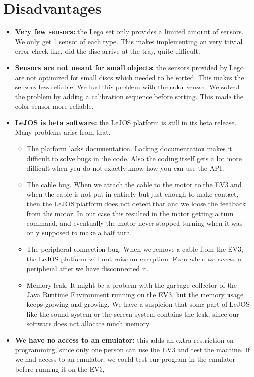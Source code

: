 \documentclass[a4paper,oneside,11pt]{article}
\begin{document}
\section{Disadvantages}
\begin{itemize}
    \item \textbf{Very few sensors:} the Lego set only provides a limited amount of sensors. We only get 1 sensor of each type. This makes implementing an very trivial error check like, did the disc arrive at the tray, quite difficult.
    \item \textbf{Sensors are not meant for small objects:} the sensors provided by Lego are not optimized for small discs which needed to be sorted. This makes the sensors less reliable. We had this problem with the color sensor. We solved the problem by adding a calibration sequence before sorting. This made the color sensor more reliable.
    \item \textbf{LeJOS is beta software: } the LeJOS platform is still in its beta release. Many problems arise from that.
        \begin{itemize}
            \item The platform lacks documentation. Lacking documentation makes it difficult to solve bugs in the code. Also the coding itself gets a lot more difficult when you do not exactly know how you can use the API.
            \item The cable bug. When we attach the cable to the motor to the EV3 and when the cable is not put in entirely but just enough to make contact, then the LeJOS platform does not detect that and we loose the feedback from the motor. In our case this resulted in the motor getting a turn command, and eventually the motor never stopped turning when it was only supposed to make a half turn.
            \item The peripheral connection bug. When we remove a cable from the EV3, the LeJOS platform will not raise an exception. Even when we access a peripheral after we have disconnected it.
            \item Memory leak. It might be a problem with the garbage collector of the Java Runtime Environment running on the EV3, but the memory usage keeps growing and growing. We have a suspicion that some part of LeJOS like the sound system or the screen system contains the leak, since our software does not allocate much memory.
        \end{itemize}
    \item \textbf{We have no access to an emulator: } this adds an extra restriction on programming, since only one person can use the EV3 and test the machine. If we had access to an emulator, we could test our program in the emulator before running it on the EV3,

\end{itemize}
\end{document}
